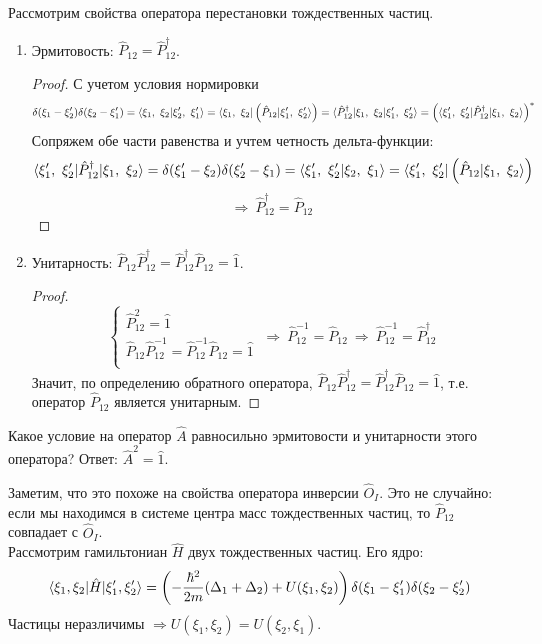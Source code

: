 Рассмотрим свойства оператора перестановки тождественных частиц.
\begin{enumerate}
	\item Эрмитовость: $\hat{P}_{12} = \hat{P}_{12}^\dagger$.
	\begin{proof}
		С учетом условия нормировки
		\[
		\delta(\xi_1 - \xi_2')\delta(\xi_2 - \xi_1') = \langle \xi_1,~\xi_2 | \xi_2',~\xi_1' \rangle = \langle \xi_1,~\xi_2 |\left(\hat{P}_{12}| \xi_1',~\xi_2' \rangle\right) = \langle \hat{P}_{12}^\dagger | \xi_1,~\xi_2 | \xi_1',~\xi_2' \rangle = \left(\langle \xi_1',~\xi_2' | \hat{P}_{12}^\dagger | \xi_1,~\xi_2 \rangle\right)^*
		\]
		Сопряжем обе части равенства и учтем четность дельта-функции:
		\[
		\langle \xi_1',~\xi_2' | \hat{P}_{12}^\dagger | \xi_1,~\xi_2 \rangle = \delta(\xi_1' - \xi_2)\delta(\xi_2' - \xi_1) = \langle \xi_1',~\xi_2' | \xi_2,~\xi_1 \rangle = \langle \xi_1',~\xi_2' |\left(\hat{P}_{12}| \xi_1,~\xi_2 \rangle\right)
		\]
		\[
		\Longrightarrow \ \hat{P}_{12}^\dagger = \hat{P}_{12}
		\]
	\end{proof}
	\item Унитарность: $\hat{P}_{12}\hat{P}_{12}^\dagger = \hat{P}_{12}^\dagger\hat{P}_{12} = \hat{1}$.
	\begin{proof}
		\[
		\begin{cases}
			\hat{P}_{12}^2 = \hat{1}\\
			\hat{P}_{12}\hat{P}_{12}^{-1} = \hat{P}_{12}^{-1}\hat{P}_{12} = \hat{1}\\
		\end{cases} \ \Longrightarrow \ \hat{P}_{12}^{-1} = \hat{P}_{12} \ \Longrightarrow \ \hat{P}_{12}^{-1} = \hat{P}_{12}^\dagger
		\]
		Значит, по определению обратного оператора, $\hat{P}_{12}\hat{P}_{12}^\dagger = \hat{P}_{12}^\dagger\hat{P}_{12}=\hat{1}$, т.е. оператор $\hat{P}_{12}$ является унитарным.
	\end{proof}   
\end{enumerate}
\begin{note}
	Какое условие на оператор $\hat{A}$ равносильно эрмитовости и унитарности этого оператора? Ответ: $\hat{A}^2 = \hat{1}$.
\end{note}


Заметим, что это похоже на свойства оператора инверсии $\hat{O}_I$. Это не случайно: если мы находимся в системе центра масс тождественных частиц, то $\hat{P}_{12}$ совпадает с $\hat{O}_I$.\\


Рассмотрим гамильтониан $\hat{H}$ двух тождественных частиц. Его ядро:
\[
\langle \xi_1, \xi_2 | \hat{H} | \xi_1', \xi_2' \rangle = \left( -\dfrac{\hbar^2}{2m}(\Delta_1 + \Delta_2) + U(\xi_1, \xi_2) \right) \delta(\xi_1 - \xi_1')\delta(\xi_2 - \xi_2')
\]
Частицы неразличимы $\Rightarrow U(\xi_1, \xi_2) = U(\xi_2, \xi_1)$.\\

